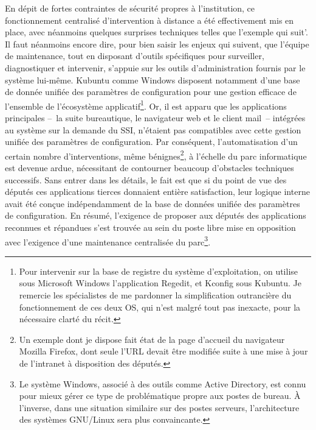 \documentclass{FramateX}
\begin{document}
\begin{refsection}
En dépit de fortes contraintes de sécurité propres à
l'institution, ce fonctionnement centralisé d'intervention à distance a
été effectivement mis en place, avec néanmoins quelques surprises
techniques telles que l'exemple qui suit'. Il faut néanmoins encore
dire, pour bien saisir les enjeux qui suivent, que l'équipe de
maintenance, tout en disposant d'outils spécifiques pour surveiller,
diagnostiquer et intervenir, s'appuie sur les outils d'administration
fournis par le système lui-même. Kubuntu comme Windows disposent
notamment d'une base de donnée unifiée des paramètres de configuration
pour une gestion efficace de l'ensemble de l'écosystème
applicatif\footnote{Pour intervenir sur la base de registre du système
d'exploitation, on utilise sous Microsoft Windows l'application
Regedit, et Kconfig sous Kubuntu. Je remercie les spécialistes de me
pardonner la simplification outrancière du fonctionnement de ces deux
OS, qui n'est malgré tout pas inexacte, pour la nécessaire clarté du
récit.}. Or, il est apparu que les applications principales
–~la suite bureautique, le navigateur web et le
client mail~– intégrées au système sur la demande du
SSI, n'étaient pas compatibles avec cette gestion unifiée des
paramètres de configuration. Par conséquent, l'automatisation d'un
certain nombre d'interventions, même bénignes\footnote{Un exemple dont
je dispose fait état de la page d'accueil du navigateur Mozilla
Firefox, dont seule l'URL devait être modifiée suite à une mise à jour
de l'intranet à disposition des députés.}, à l'échelle du parc
informatique est devenue ardue, nécessitant de contourner beaucoup
d'obstacles techniques successifs. Sans entrer dans les détails, le
fait est que si du point de vue des députés ces applications tierces
donnaient entière satisfaction, leur logique interne avait été conçue
indépendamment de la base de données unifiée des paramètres de
configuration. En résumé, l'exigence de proposer aux députés des
applications reconnues et répandues s'est trouvée au sein du poste
libre mise en opposition avec l'exigence d'une maintenance centralisée
du parc\footnote{Le système Windows, associé à des outils comme Active
Directory, est connu pour mieux gérer ce type de problématique propre
aux postes de bureau. À l'inverse, dans une situation similaire sur des
postes serveurs, l'architecture des systèmes GNU/Linux sera plus
convaincante.}.



\end{refsection}
\end{document}
